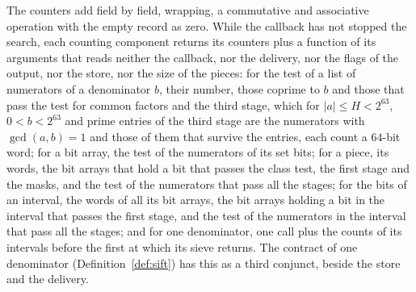 \begin{lemma}\label{lem:counters}
  \leanok
  The counters add field by field, wrapping, a commutative and associative operation with the empty
  record as zero. While the callback has not stopped the search, each counting component returns its
  counters plus a function of its arguments that reads neither the callback, nor the delivery, nor
  the flags of the output, nor the store, nor the size of the pieces: for the test of a list of
  numerators of a denominator $b$, their number, those coprime to $b$ and those that pass the test
  for common factors and the third stage, which for $|a| \le H < 2^{63}$, $0 < b < 2^{63}$ and prime
  entries of the third stage are the numerators with $\gcd(a, b) = 1$ and those of them that survive
  the entries, each count a $64$-bit word; for a bit array, the test of the numerators of its set
  bits; for a piece, its words, the bit arrays that hold a bit that passes the class test, the first
  stage and the masks, and the test of the numerators that pass all the stages; for the bits of an
  interval, the words of all its bit arrays, the bit arrays holding a bit in the interval that
  passes the first stage, and the test of the numerators in the interval that pass all the stages;
  and for one denominator, one call plus the counts of its intervals before the first at which its
  sieve returns. The contract of one denominator (Definition~\ref{def:sift}) has this as a third
  conjunct, beside the store and the delivery.
\end{lemma}

